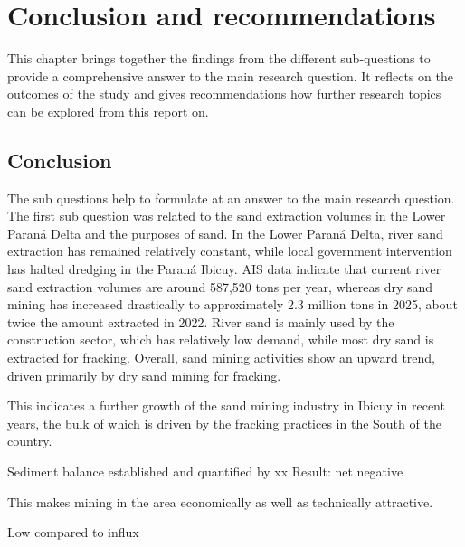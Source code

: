 \chapter{Conclusion and recommendations}
\label{chapter:conclusion}
This chapter brings together the findings from the different sub-questions to provide a comprehensive answer to the main research question. It reflects on the outcomes of the study and gives recommendations how further research topics can be explored from this report on.

\section{Conclusion}
The sub questions help to formulate at an answer to the main research question. The first sub question was related to the sand extraction volumes in the Lower Paraná Delta and the purposes of sand. In the Lower Paraná Delta, river sand extraction has remained relatively constant, while local government intervention has halted dredging in the Paraná Ibicuy. AIS data indicate that current river sand extraction volumes are around 587,520 tons per year, whereas dry sand mining has increased drastically to approximately 2.3 million tons in 2025, about twice the amount extracted in 2022. River sand is mainly used by the construction sector, which has relatively low demand, while most dry sand is extracted for fracking. Overall, sand mining activities show an upward trend, driven primarily by dry sand mining for fracking.



This indicates a further growth of the sand mining industry in Ibicuy in recent years, the bulk of which is driven by the fracking practices in the South of the country.

Sediment balance established and quantified by xx
Result: net negative

This makes mining in the area economically as well as technically attractive.


Low compared to influx







